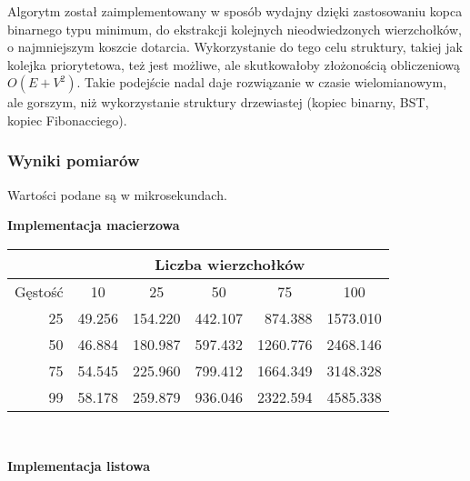 \documentclass[12pt]{article}
\begin{document}
Algorytm został zaimplementowany w sposób wydajny dzięki zastosowaniu kopca binarnego typu minimum, do ekstrakcji kolejnych nieodwiedzonych wierzchołków, o najmniejszym koszcie dotarcia. Wykorzystanie do tego celu struktury, takiej jak kolejka priorytetowa, też jest możliwe, ale skutkowałoby złożonością obliczeniową \( O(E + V^2) \). Takie podejście nadal daje rozwiązanie w czasie wielomianowym, ale gorszym, niż wykorzystanie struktury drzewiastej (kopiec binarny, BST, kopiec Fibonacciego).

\subsubsection{Wyniki pomiarów}

Wartości podane są w mikrosekundach.

\textbf{Implementacja macierzowa}\\
\begin{center}
\begin{tabular}{|r|r|r|r|r|r|}
\hline
                              & \multicolumn{5}{c|}{Liczba wierzchołków}                                                                                         \\ \hline
\multicolumn{1}{|c|}{Gęstość} & \multicolumn{1}{c|}{10} & \multicolumn{1}{c|}{25} & \multicolumn{1}{c|}{50} & \multicolumn{1}{c|}{75} & \multicolumn{1}{c|}{100} \\ \hline
25                  & 49.256 & 154.220 & 442.107 & 874.388  & 1573.010 \\ \hline
50                  & 46.884 & 180.987 & 597.432 & 1260.776 & 2468.146 \\ \hline
75                  & 54.545 & 225.960 & 799.412 & 1664.349 & 3148.328 \\ \hline
99                  & 58.178 & 259.879 & 936.046 & 2322.594 & 4585.338 \\ \hline
\end{tabular}
\end{center}
\\
\newpage

\textbf{Implementacja listowa}\\
\end{document}
